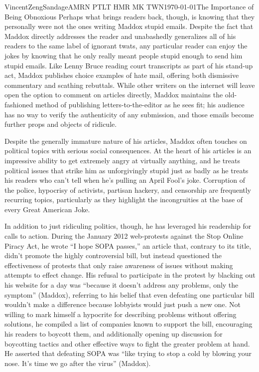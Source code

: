\documentclass[12 pt]{article}
\begin{document}
\begin{mla}{Vincent}{Zeng}{Sandage}{AMRN PTLT HMR MK TWN}{\today}{The Importance of Being Obnoxious}
	Perhaps what brings readers back, though, is knowing that they personally were not the ones writing Maddox stupid emails. Despite the fact that Maddox directly addresses the reader and unabashedly generalizes all of his readers to the same label of ignorant twats, any particular reader can enjoy the jokes by knowing that he only really meant people stupid enough to send him stupid emails. Like Lenny Bruce reading court transcripts as part of his stand-up act, Maddox publishes choice examples of hate mail, offering both dismissive commentary and scathing rebuttals. While other writers on the internet will leave open the option to comment on articles directly, Maddox maintains the old-fashioned method of publishing letters-to-the-editor as he sees fit; his audience has no way to verify the authenticity of any submission, and those emails become further props and objects of ridicule. 

	Despite the generally immature nature of his articles, Maddox often touches on political topics with serious social consequences. At the heart of his articles is an impressive ability to get extremely angry at virtually anything, and he treats political issues that strike him as unforgivingly stupid just as badly as he treats his readers who can't tell when he's pulling an April Fool's joke. Corruption of the police, hypocrisy of activists, partisan hackery, and censorship are frequently recurring topics, particularly as they highlight the incongruities at the base of every Great American Joke.

	In addition to just ridiculing politics, though, he has leveraged his readership for calls to action. During the January 2012 web-protests against the Stop Online Piracy Act, he wrote ``I hope SOPA passes,'' an article that, contrary to its title, didn't promote the highly controversial bill, but instead questioned the effectiveness of protests that only raise awareness of issues without making attempts to effect change. His refusal to participate in the protest by blacking out his website for a day was ``because it doesn't address any problems, only the symptom'' (Maddox), referring to his belief that even defeating one particular bill wouldn't make a difference because lobbyists would just push a new one. Not willing to mark himself a hypocrite for describing problems without offering solutions, he compiled a list of companies known to support the bill, encouraging his readers to boycott them, and additionally opening up discussion for boycotting tactics and other effective ways to fight the greater problem at hand. He asserted that defeating SOPA was ``like trying to stop a cold by blowing your nose. It's time we go after the virus'' (Maddox). 


\end{mla}
\end{document}
